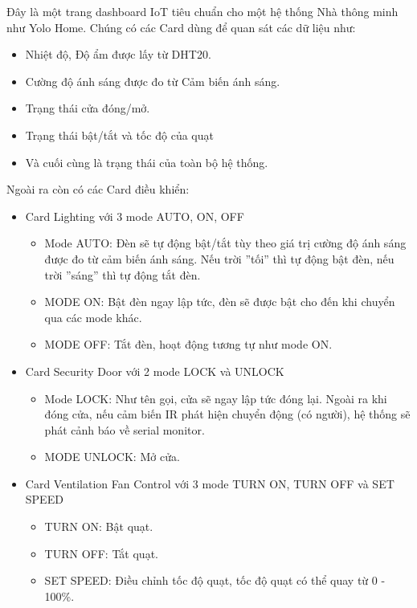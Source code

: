 Đây là một trang dashboard IoT tiêu chuẩn cho một hệ thống Nhà thông minh như Yolo Home. Chúng có các Card dùng để quan sát các dữ liệu như:
\begin{itemize}
    \item Nhiệt độ, Độ ẩm được lấy từ DHT20.
    \item Cường độ ánh sáng được đo từ Cảm biến ánh sáng.
    \item Trạng thái cửa đóng/mở.
    \item Trạng thái bật/tắt và tốc độ của quạt
    \item Và cuối cùng là trạng thái của toàn bộ hệ thống.
\end{itemize}
Ngoài ra còn có các Card điều khiển:
\begin{itemize}
    \item Card Lighting với 3 mode AUTO, ON, OFF
    \begin{itemize}
        \item Mode AUTO: Đèn sẽ tự động bật/tắt tùy theo giá trị cường độ ánh sáng được đo từ cảm biến ánh sáng. Nếu trời ”tối” thì tự động bật đèn, nếu trời ”sáng” thì tự động tắt đèn.
        \item MODE ON: Bật đèn ngay lập tức, đèn sẽ được bật cho đến khi chuyển qua các mode khác.
        \item MODE OFF: Tắt đèn, hoạt động tương tự như mode ON.
    \end{itemize}
    \item Card Security Door với 2 mode LOCK và UNLOCK
    \begin{itemize}
        \item Mode LOCK: Như tên gọi, cửa sẽ ngay lập tức đóng lại. Ngoài ra khi đóng cửa, nếu cảm biến IR phát hiện chuyển động (có người), hệ thống sẽ phát cảnh báo về serial monitor.
        \item MODE UNLOCK: Mở cửa.
    \end{itemize}
    \item Card Ventilation Fan Control với 3 mode TURN ON, TURN OFF và SET SPEED
    \begin{itemize}
        \item TURN ON: Bật quạt.
        \item TURN OFF: Tắt quạt.
        \item SET SPEED: Điều chỉnh tốc độ quạt, tốc độ quạt có thể quay từ 0 - 100\%.
    \end{itemize}
\end{itemize}


